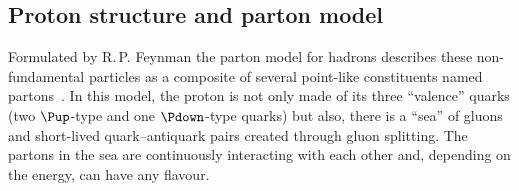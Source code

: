 \subsection{Proton structure and parton model}
\label{sec:Chap2:PhenoOfPP:ProtonStructure}

Formulated by R.$\,$P. Feynman the parton model for hadrons describes these non-fundamental 
particles as a composite of several point-like constituents named partons~\cite{Feynman:1969ej}.
In this model, the proton is not only made of its three ``valence''  quarks 
(two $\Pup$-type and one $\Pdown$-type quarks) but also, there is a ``sea'' of
gluons and short-lived quark--antiquark pairs created through gluon splitting.
The partons in the sea are continuously interacting with each other and, depending
on the energy, can have any flavour.




